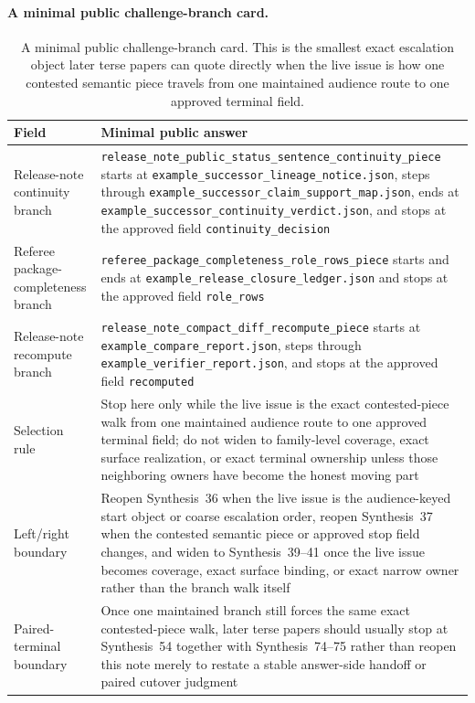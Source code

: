 \documentclass[11pt]{article}
\begin{document}
\paragraph{A minimal public challenge-branch card.}
\begin{table}[t]
\centering
\small
\begin{tabularx}{\linewidth}{@{}lX@{}}
\toprule
Field & Minimal public answer \\
\midrule
Release-note continuity branch & \nolinkurl{release_note_public_status_sentence_continuity_piece} starts at \nolinkurl{example_successor_lineage_notice.json}, steps through \nolinkurl{example_successor_claim_support_map.json}, ends at \nolinkurl{example_successor_continuity_verdict.json}, and stops at the approved field \nolinkurl{continuity_decision} \\
Referee package-completeness branch & \nolinkurl{referee_package_completeness_role_rows_piece} starts and ends at \nolinkurl{example_release_closure_ledger.json} and stops at the approved field \nolinkurl{role_rows} \\
Release-note recompute branch & \nolinkurl{release_note_compact_diff_recompute_piece} starts at \nolinkurl{example_compare_report.json}, steps through \nolinkurl{example_verifier_report.json}, and stops at the approved field \nolinkurl{recomputed} \\
Selection rule & Stop here only while the live issue is the exact contested-piece walk from one maintained audience route to one approved terminal field; do not widen to family-level coverage, exact surface realization, or exact terminal ownership unless those neighboring owners have become the honest moving part \\
Left/right boundary & Reopen Synthesis~36 when the live issue is the audience-keyed start object or coarse escalation order, reopen Synthesis~37 when the contested semantic piece or approved stop field changes, and widen to Synthesis~39--41 once the live issue becomes coverage, exact surface binding, or exact narrow owner rather than the branch walk itself \\
Paired-terminal boundary & Once one maintained branch still forces the same exact contested-piece walk, later terse papers should usually stop at Synthesis~54 together with Synthesis~74--75 rather than reopen this note merely to restate a stable answer-side handoff or paired cutover judgment \\
\bottomrule
\end{tabularx}
\caption{A minimal public challenge-branch card. This is the smallest exact escalation object later terse papers can quote directly when the live issue is how one contested semantic piece travels from one maintained audience route to one approved terminal field.}
\label{tab:minimal-public-challenge-branch-card}
\end{table}
\end{document}
